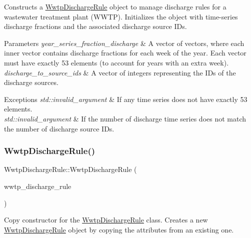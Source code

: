 Constructs a {\ttfamily \mbox{\hyperlink{classWwtpDischargeRule}{Wwtp\+Discharge\+Rule}}} object to manage discharge rules for a wastewater treatment plant (W\+W\+TP). Initializes the object with time-\/series discharge fractions and the associated discharge source I\+Ds. 


\begin{DoxyParams}{Parameters}
{\em year\+\_\+series\+\_\+fraction\+\_\+discharge} & A vector of vectors, where each inner vector contains discharge fractions for each week of the year. Each vector must have exactly 53 elements (to account for years with an extra week). \\
\hline
{\em discharge\+\_\+to\+\_\+source\+\_\+ids} & A vector of integers representing the I\+Ds of the discharge sources.\\
\hline
\end{DoxyParams}

\begin{DoxyExceptions}{Exceptions}
{\em std\+::invalid\+\_\+argument} & If any time series does not have exactly 53 elements. \\
\hline
{\em std\+::invalid\+\_\+argument} & If the number of discharge time series does not match the number of discharge source I\+Ds. \\
\hline
\end{DoxyExceptions}
\mbox{\label{classWwtpDischargeRule_ac433e50df1414ba4bbb40022832b43ff}} 
\subsubsection{\texorpdfstring{Wwtp\+Discharge\+Rule()}{WwtpDischargeRule()}\hspace{0.1cm}{\footnotesize\ttfamily [2/2]}}
{\footnotesize\ttfamily Wwtp\+Discharge\+Rule\+::\+Wwtp\+Discharge\+Rule (\begin{DoxyParamCaption}\item[{\mbox{\hyperlink{classWwtpDischargeRule}{Wwtp\+Discharge\+Rule}} \&}]{wwtp\+\_\+discharge\+\_\+rule }\end{DoxyParamCaption})}



Copy constructor for the {\ttfamily \mbox{\hyperlink{classWwtpDischargeRule}{Wwtp\+Discharge\+Rule}}} class. Creates a new {\ttfamily \mbox{\hyperlink{classWwtpDischargeRule}{Wwtp\+Discharge\+Rule}}} object by copying the attributes from an existing one. 


